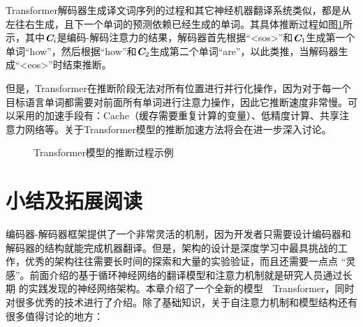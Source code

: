 \parinterval Transformer解码器生成译文词序列的过程和其它神经机器翻译系统类似，都是从左往右生成，且下一个单词的预测依赖已经生成的单词。其具体推断过程如图\ref{fig:12-19}所示，其中$\textbf{\em C}_i$是编码-解码注意力的结果，解码器首先根据“<sos>”和$\textbf{\em C}_1$生成第一个单词“how”，然后根据“how”和$\textbf{\em C}_2$生成第二个单词“are”，以此类推，当解码器生成“<eos>”时结束推断。

\parinterval 但是，Transformer在推断阶段无法对所有位置进行并行化操作，因为对于每一个目标语言单词都需要对前面所有单词进行注意力操作，因此它推断速度非常慢。可以采用的加速手段有：Cache（缓存需要重复计算的变量）、低精度计算、共享注意力网络等。关于Transformer模型的推断加速方法将会在{\chapterfourteen}进一步深入讨论。

\begin{figure}[htp]
\centering

\caption{Transformer模型的推断过程示例}
\label{fig:12-19}
\end{figure}



\sectionnewpage
\section{小结及拓展阅读}

\parinterval 编码器­-解码器框架提供了一个非常灵活的机制，因为开发者只需要设计编码器和解码器的结构就能完成机器翻译。但是，架构的设计是深度学习中最具挑战的工
作，优秀的架构往往需要长时间的探索和大量的实验验证，而且还需要一点点 “灵感”。前面介绍的基于循环神经网络的翻译模型和注意力机制就是研究人员通过长期
的实践发现的神经网络架构。本章介绍了一个全新的模型\ \dash \ Transformer，同时对很多优秀的技术进行了介绍。除了基础知识，关于自注意力机制和模型结构还有很多值得讨论的地方：

